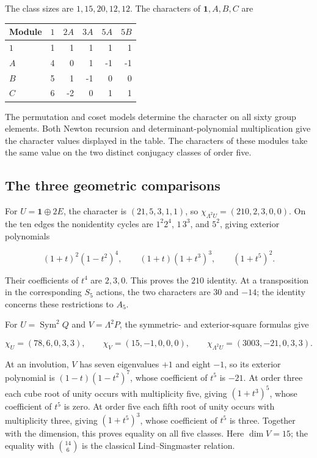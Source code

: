\documentclass[11pt,a4paper]{article}
\begin{document}
The class sizes are \(1,15,20,12,12\). The characters of $\mathbf1,A,B,C$ are

{\small
\begin{longtable}[]{@{}lrrrrr@{}}
\toprule\noalign{}
Module & \(1\) & \(2A\) & \(3A\) & \(5A\) & \(5B\) \\
\midrule\noalign{}
\endhead
\bottomrule\noalign{}
\endlastfoot
\(1\) & 1 & 1 & 1 & 1 & 1 \\
\(A\) & 4 & 0 & 1 & -1 & -1 \\
\(B\) & 5 & 1 & -1 & 0 & 0 \\
\(C\) & 6 & -2 & 0 & 1 & 1 \\
\end{longtable}
}

The permutation and coset models determine the character on all sixty group elements. Both Newton recursion and determinant-polynomial multiplication give the character values displayed in the table. The characters of these modules take the same value on the two distinct conjugacy classes of order five.

\subsection{The three geometric comparisons}\label{subsec:A3}

For \(U=\mathbf1\oplus2E\), the character is \((21,5,3,1,1)\), so \(\chi_{\Lambda^2U}=(210,2,3,0,0)\). On the ten edges the nonidentity cycles are \(1^2 2^4\), \(1\,3^3\), and \(5^2\), giving exterior polynomials

\[
(1+t)^2(1-t^2)^4,\qquad (1+t)(1+t^3)^3,\qquad(1+t^5)^2.
\]

Their coefficients of \(t^4\) are \(2,3,0\). This proves the \(210\) identity. At a transposition in the corresponding \(S_5\) actions, the two characters are \(30\) and \(-14\); the identity concerns these restrictions to \(A_5\).

For \(U=\operatorname{Sym}^2Q\) and \(V=\Lambda^2P\), the symmetric- and exterior-square formulas give

\[
\chi_U=(78,6,0,3,3),\qquad \chi_V=(15,-1,0,0,0),
\qquad\chi_{\Lambda^2U}=(3003,-21,0,3,3).
\]

At an involution, \(V\) has seven eigenvalues \(+1\) and eight \(-1\), so its exterior polynomial is \((1-t)(1-t^2)^7\), whose coefficient of \(t^5\) is \(-21\). At order three each cube root of unity occurs with multiplicity five, giving \((1+t^3)^5\), whose coefficient of \(t^5\) is zero. At order five each fifth root of unity occurs with multiplicity three, giving \((1+t^5)^3\), whose coefficient of \(t^5\) is three. Together with the dimension, this proves equality on all five classes. Here $\dim V=15$; the equality with \(\binom{14}{6}\) is the classical Lind--Singmaster relation.
\end{document}
